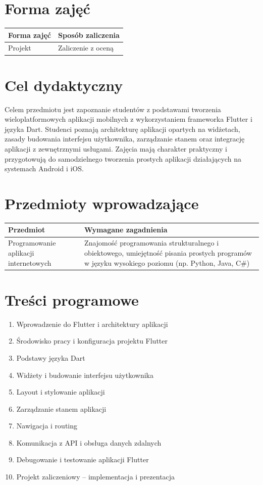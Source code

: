 \documentclass[12pt, a4paper]{article}
\begin{document}
\section{Forma zajęć}

\begin{tabular}{ll}
  \hline
  \textbf{Forma zajęć} & \textbf{Sposób zaliczenia} \\
  \hline
  Projekt & Zaliczenie z oceną \\
  \hline
\end{tabular}

\section{Cel dydaktyczny}

Celem przedmiotu jest zapoznanie studentów z podstawami tworzenia wieloplatformowych aplikacji mobilnych z wykorzystaniem frameworka Flutter i języka Dart. Studenci poznają architekturę aplikacji opartych na widżetach, zasady budowania interfejsu użytkownika, zarządzanie stanem oraz integrację aplikacji z zewnętrznymi usługami. Zajęcia mają charakter praktyczny i przygotowują do samodzielnego tworzenia prostych aplikacji działających na systemach Android i iOS.

\section{Przedmioty wprowadzające}

\begin{tabularx}{\textwidth}{lX}
  \hline
  \textbf{Przedmiot} & \textbf{Wymagane zagadnienia} \\
  \hline
  Programowanie aplikacji internetowych & Znajomość programowania strukturalnego i obiektowego, umiejętność pisania prostych programów w języku wysokiego poziomu (np. Python, Java, C\#) \\
  \hline
\end{tabularx}

\section{Treści programowe}

\begin{enumerate}
  \item Wprowadzenie do Flutter i architektury aplikacji
  \item Środowisko pracy i konfiguracja projektu Flutter
  \item Podstawy języka Dart
  \item Widżety i budowanie interfejsu użytkownika
  \item Layout i stylowanie aplikacji
  \item Zarządzanie stanem aplikacji
  \item Nawigacja i routing
  \item Komunikacja z API i obsługa danych zdalnych
  \item Debugowanie i testowanie aplikacji Flutter
  \item Projekt zaliczeniowy – implementacja i prezentacja
\end{enumerate}
\end{document}
